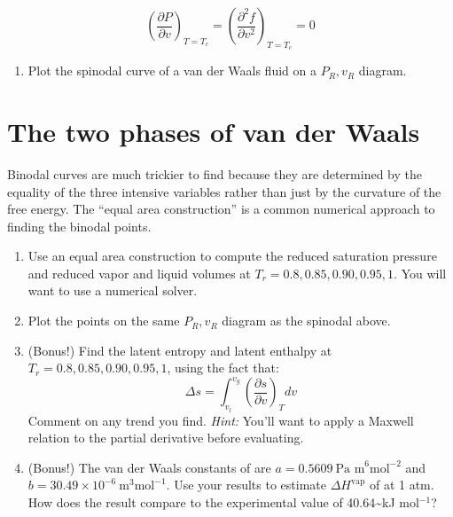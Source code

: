 \documentclass[11pt]{article}
\begin{document}
\begin{equation*}
  \left ( \frac{\partial P}{\partial v} \right )_{T=T_c} = \left (
    \frac{\partial^2 f}{\partial v^2} \right )_{T=T_c} = 0
\end{equation*}

\begin{enumerate}
\item Plot the spinodal curve of a van der Waals fluid on a \(P_R, v_R\) diagram.
\end{enumerate}

\section{The two phases of van der Waals}
\label{sec:org5f5fff0}
Binodal curves are much trickier to find because they are determined by the equality of the three intensive variables rather than just by the curvature of the free energy.  The ``equal area construction'' is a common numerical approach to finding the binodal points.

\begin{enumerate}
\item Use an equal area construction to compute the reduced saturation pressure and
reduced vapor and liquid volumes at \(T_r = 0.8, 0.85, 0.90, 0.95, 1\).  You will want
to use a numerical solver.

\item Plot the points on the same \(P_R, v_R\) diagram as the spinodal above.

\item (Bonus!) Find the latent entropy and latent enthalpy at  \(T_r = 0.8, 0.85, 0.90, 0.95, 1\), using the fact that:
\begin{equation*}
  \Delta s = \int_{v_l}^{v_g} \left ( \frac{\partial s}{\partial v} \right )_T dv
\end{equation*}
Comment on any trend you find. \textit{Hint:} You'll want to apply a Maxwell relation to the partial derivative before evaluating.

\item (Bonus!) The van der Waals constants of  are \(a = 0.5609~\text{Pa
      m}^6\text{mol}^{-2}\) and \(b = 30.49\times10^{-6}~\text{m}^3\text{mol}^{-1}\).  Use
your results to estimate \(\Delta H^\text{vap}\) of  at 1 atm.  How does the result compare to the experimental value of 40.64\textasciitilde{}kJ mol\(^{-1}\)?
\end{enumerate}
\end{document}
